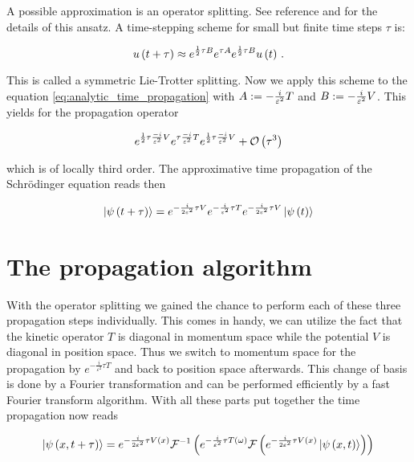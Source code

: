 A possible approximation is an operator splitting. See reference \cite{J_C_operator_splitting}
and \cite{Gradinaru_strangsplitting} for the details of this ansatz. A time-stepping
scheme for small but finite time steps $\tau$ is:

\begin{equation} \label{eq:general_operator_splitting}
  u\left( t+\tau \right) \approx e^{\frac{1}{2}\tau B} e^{\tau A} e^{\frac{1}{2}\tau B} u\left( t \right) \,.
\end{equation}

This is called a symmetric Lie-Trotter splitting. Now we apply this scheme to the
equation \eqref{eq:analytic_time_propagation} with $A := -\frac{i}{\varepsilon^2} T$
and $B := -\frac{i}{\varepsilon^2} V$. This yields for the propagation operator

\begin{equation}
  e^{\frac{1}{2} \tau \frac{-i}{\varepsilon^2} V}
  e^{\tau \frac{-i}{\varepsilon^2} T}
  e^{\frac{1}{2} \tau \frac{-i}{\varepsilon^2} V}
  + \mathcal{O}\left( \tau^3 \right)
\end{equation}

which is of locally third order. The approximative time propagation of the Schrödinger
equation reads then

\begin{equation} \label{eq:operator:splitting_propagation}
  \Ket{\psi\left( t + \tau \right)}
  =
  e^{-\frac{i}{2\varepsilon^2} \tau V}
  e^{-\frac{i}{\varepsilon^2} \tau T}
  e^{-\frac{i}{2\varepsilon^2} \tau V}
  \Ket{\psi\left( t \right)}
\end{equation}


\section{The propagation algorithm}

With the operator splitting we gained the chance to perform each of these three propagation
steps individually. This comes in handy, we can utilize the fact that the kinetic
operator $T$ is diagonal in momentum space while the potential $V$ is diagonal in
position space. Thus we switch to momentum space for the propagation by $e^{-\frac{i}{\varepsilon^2} \tau T}$
and back to position space afterwards. This change of basis is done by a Fourier
transformation and can be performed efficiently by a fast Fourier transform
algorithm. With all these parts put together the time propagation now reads

\begin{equation} \label{eq:Fourier_propagation_simple}
  \Ket{\psi\left( x,t+\tau \right)}
  =
  e^{-\frac{i}{2\varepsilon^2} \tau V\left( x \right)}
  \mathcal{F}^{-1}\left(
  e^{-\frac{i}{\varepsilon^2} \tau T\left( \omega \right)}
  \mathcal{F}\left(
  e^{-\frac{i}{2\varepsilon^2} \tau V\left( x \right)}
  \Ket{\psi\left( x,t \right)}\right)\right)
\end{equation}

